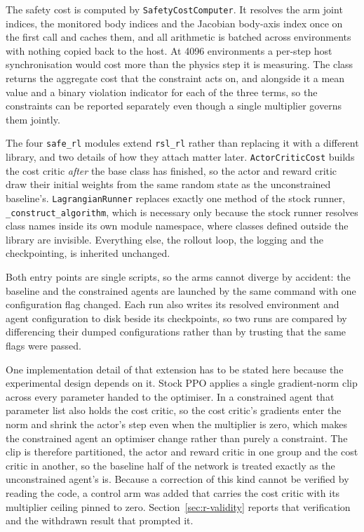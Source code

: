 The safety cost is computed by \texttt{SafetyCostComputer}. It resolves the arm joint indices, the
monitored body indices and the Jacobian body-axis index once on the first call and caches them, and
all arithmetic is batched across environments with nothing copied back to the host. At 4096
environments a per-step host synchronisation would cost more than the physics step it is measuring.
The class returns the aggregate cost that the constraint acts on, and alongside it a mean value and
a binary violation indicator for each of the three terms, so the constraints can be reported
separately even though a single multiplier governs them jointly.

The four \texttt{safe\_rl} modules extend \texttt{rsl\_rl} \cite{rudin2022walk} rather than replacing
it with a different library, and two details of how they attach matter later.
\texttt{ActorCriticCost} builds the cost critic \emph{after} the base class has finished, so the
actor and reward critic draw their initial weights from the same random state as the unconstrained
baseline's. \texttt{LagrangianRunner} replaces exactly one method of the stock runner,
\texttt{\_construct\_algorithm}, which is necessary only because the stock runner resolves class
names inside its own module namespace, where classes defined outside the library are invisible.
Everything else, the rollout loop, the logging and the checkpointing, is inherited unchanged.

Both entry points are single scripts, so the arms cannot diverge by accident: the baseline and the
constrained agents are launched by the same command with one configuration flag changed. Each run
also writes its resolved environment and agent configuration to disk beside its checkpoints, so two
runs are compared by differencing their dumped configurations rather than by trusting that the same
flags were passed.

One implementation detail of that extension has to be stated here because the experimental design
depends on it. Stock PPO applies a single gradient-norm clip across every parameter handed to the
optimiser. In a constrained agent that parameter list also holds the cost critic, so the cost
critic's gradients enter the norm and shrink the actor's step even when the multiplier is zero,
which makes the constrained agent an optimiser change rather than purely a constraint. The clip is
therefore partitioned, the actor and reward critic in one group and the cost critic in another, so
the baseline half of the network is treated exactly as the unconstrained agent's is. Because a
correction of this kind cannot be verified by reading the code, a control arm was added that carries
the cost critic with its multiplier ceiling pinned to zero. Section~\ref{sec:r-validity} reports
that verification and the withdrawn result that prompted it.

